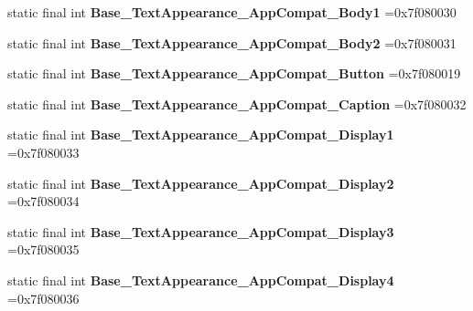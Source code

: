\begin{DoxyCompactItemize}
\item 
\hypertarget{classcheck_1_1test_1_1_r_1_1style_a6c90194a77a5e8ecd671715fdeb8b10a}{}static final int {\bfseries Base\+\_\+\+Text\+Appearance\+\_\+\+App\+Compat\+\_\+\+Body1} =0x7f080030\label{classcheck_1_1test_1_1_r_1_1style_a6c90194a77a5e8ecd671715fdeb8b10a}

\item 
\hypertarget{classcheck_1_1test_1_1_r_1_1style_ac1858da6d242d2b38ed429fe849a2697}{}static final int {\bfseries Base\+\_\+\+Text\+Appearance\+\_\+\+App\+Compat\+\_\+\+Body2} =0x7f080031\label{classcheck_1_1test_1_1_r_1_1style_ac1858da6d242d2b38ed429fe849a2697}

\item 
\hypertarget{classcheck_1_1test_1_1_r_1_1style_ab95c66b3ff1555b885f72fef094e7a6d}{}static final int {\bfseries Base\+\_\+\+Text\+Appearance\+\_\+\+App\+Compat\+\_\+\+Button} =0x7f080019\label{classcheck_1_1test_1_1_r_1_1style_ab95c66b3ff1555b885f72fef094e7a6d}

\item 
\hypertarget{classcheck_1_1test_1_1_r_1_1style_ab400fc9a79c3061c993ebc0a8eafaabf}{}static final int {\bfseries Base\+\_\+\+Text\+Appearance\+\_\+\+App\+Compat\+\_\+\+Caption} =0x7f080032\label{classcheck_1_1test_1_1_r_1_1style_ab400fc9a79c3061c993ebc0a8eafaabf}

\item 
\hypertarget{classcheck_1_1test_1_1_r_1_1style_ad864d7092f1bdf3c1e22b388df1eb4f9}{}static final int {\bfseries Base\+\_\+\+Text\+Appearance\+\_\+\+App\+Compat\+\_\+\+Display1} =0x7f080033\label{classcheck_1_1test_1_1_r_1_1style_ad864d7092f1bdf3c1e22b388df1eb4f9}

\item 
\hypertarget{classcheck_1_1test_1_1_r_1_1style_a504a7f23ef9899334145689ea6495a52}{}static final int {\bfseries Base\+\_\+\+Text\+Appearance\+\_\+\+App\+Compat\+\_\+\+Display2} =0x7f080034\label{classcheck_1_1test_1_1_r_1_1style_a504a7f23ef9899334145689ea6495a52}

\item 
\hypertarget{classcheck_1_1test_1_1_r_1_1style_ab5a4f61262e06bf66e6d9e2cbdbc51ca}{}static final int {\bfseries Base\+\_\+\+Text\+Appearance\+\_\+\+App\+Compat\+\_\+\+Display3} =0x7f080035\label{classcheck_1_1test_1_1_r_1_1style_ab5a4f61262e06bf66e6d9e2cbdbc51ca}

\item 
\hypertarget{classcheck_1_1test_1_1_r_1_1style_aef765af3e5a55b1e1197bf77b34617f3}{}static final int {\bfseries Base\+\_\+\+Text\+Appearance\+\_\+\+App\+Compat\+\_\+\+Display4} =0x7f080036\label{classcheck_1_1test_1_1_r_1_1style_aef765af3e5a55b1e1197bf77b34617f3}


\end{DoxyCompactItemize}
